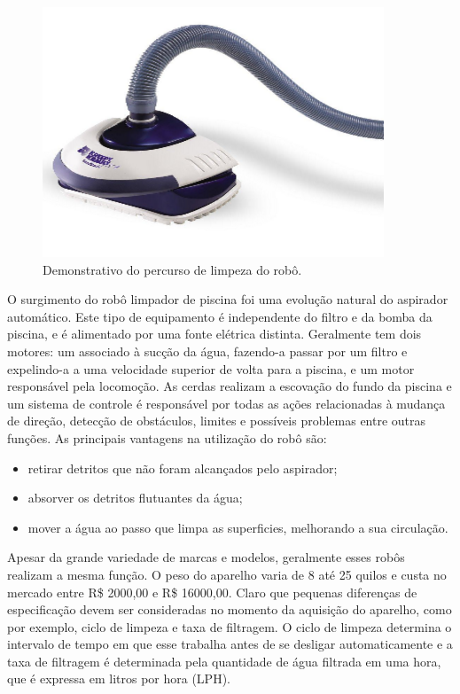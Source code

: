 \begin{figure}[h]
    \centering
    \includegraphics[width=\textwidth]{figures/limpa_piscina_auto.png}
    \caption{Demonstrativo do percurso de limpeza do robô.}
    \label{fig:schema-way-robot}
  \end{figure}

O surgimento do robô limpador de piscina foi uma evolução natural do aspirador 
automático. Este tipo de equipamento é independente do filtro e da bomba da 
piscina, e é alimentado por uma fonte elétrica distinta. Geralmente tem dois 
motores: um associado à sucção da água, fazendo-a passar por um filtro e 
expelindo-a a uma velocidade superior de volta para a piscina, e um motor 
responsável pela locomoção. As cerdas realizam a escovação do fundo da piscina 
e um sistema de controle é responsável por todas as ações relacionadas à 
mudança de direção, detecção de obstáculos, limites e possíveis problemas entre
outras funções. As principais vantagens na utilização do robô são:

\begin{itemize}
  \item retirar detritos que não foram alcançados pelo aspirador;
  \item absorver os detritos flutuantes da água;
  \item mover a água ao passo que limpa as superficies, melhorando a sua circulação.
\end{itemize}
 
Apesar da grande variedade de marcas e modelos, geralmente esses robôs realizam
a mesma função. O peso do aparelho varia de 8 até 25 quilos e  custa no mercado
entre  R\$ 2000,00 e  R\$ 16000,00. Claro que pequenas diferenças de 
especificação devem ser consideradas no momento da aquisição do aparelho, como 
por exemplo, ciclo de limpeza e taxa de filtragem. O ciclo de limpeza determina
o intervalo de tempo em que esse trabalha antes de se desligar automaticamente 
e a taxa de filtragem é determinada pela quantidade de água filtrada em uma 
hora, que é expressa em litros por hora (LPH).

